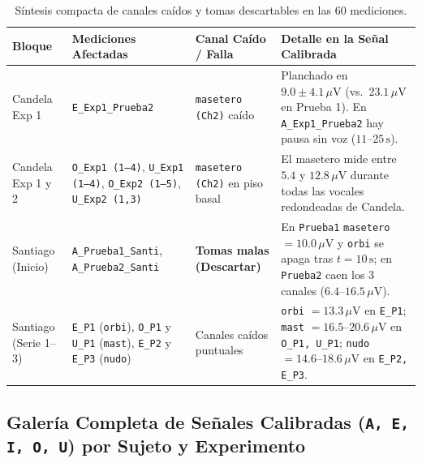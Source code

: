\documentclass[11pt, a4paper]{article}
\begin{document}
\begin{table}[H]
\centering
\scriptsize
\begin{tabularx}{\textwidth}{l l l X}
\toprule
\textbf{Bloque} & \textbf{Mediciones Afectadas} & \textbf{Canal Caído / Falla} & \textbf{Detalle en la Señal Calibrada} \\
\midrule
Candela Exp 1 & \texttt{E\_Exp1\_Prueba2} & \texttt{masetero (Ch2)} caído & Planchado en $9.0 \pm 4.1\,\mu\text{V}$ (vs.\ $23.1\,\mu\text{V}$ en Prueba 1). En \texttt{A\_Exp1\_Prueba2} hay pausa sin voz ($11\text{--}25\,\text{s}$). \\
Candela Exp 1 y 2 & \texttt{O\_Exp1 (1--4)}, \texttt{U\_Exp1 (1--4)}, \texttt{O\_Exp2 (1--5)}, \texttt{U\_Exp2 (1,3)} & \texttt{masetero (Ch2)} en piso basal & El masetero mide entre $5.4$ y $12.8\,\mu\text{V}$ durante todas las vocales redondeadas de Candela. \\
Santiago (Inicio) & \texttt{A\_Prueba1\_Santi}, \texttt{A\_Prueba2\_Santi} & \textbf{Tomas malas (Descartar)} & En \texttt{Prueba1} \texttt{masetero} $=10.0\,\mu\text{V}$ y \texttt{orbi} se apaga tras $t=10\,\text{s}$; en \texttt{Prueba2} caen los 3 canales ($6.4\text{--}16.5\,\mu\text{V}$). \\
Santiago (Serie 1--3) & \texttt{E\_P1} (\texttt{orbi}), \texttt{O\_P1} y \texttt{U\_P1} (\texttt{mast}), \texttt{E\_P2} y \texttt{E\_P3} (\texttt{nudo}) & Canales caídos puntuales & \texttt{orbi} $=13.3\,\mu\text{V}$ en \texttt{E\_P1}; \texttt{mast} $=16.5\text{--}20.6\,\mu\text{V}$ en \texttt{O\_P1, U\_P1}; \texttt{nudo} $=14.6\text{--}18.6\,\mu\text{V}$ en \texttt{E\_P2, E\_P3}. \\
\bottomrule
\end{tabularx}
\caption{Síntesis compacta de canales caídos y tomas descartables en las 60 mediciones.}
\label{tab:canales_caidos}
\end{table}

\subsection{Galería Completa de Señales Calibradas (\texttt{A, E, I, O, U}) por Sujeto y Experimento}
\end{document}
